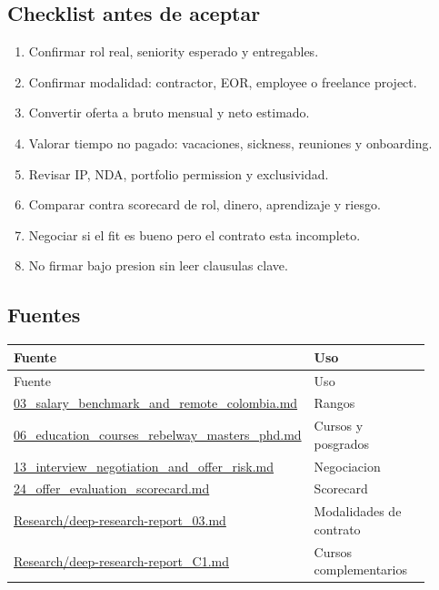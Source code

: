 \subsection{Checklist antes de aceptar}


\begin{enumerate}
\item Confirmar rol real, seniority esperado y entregables.
\item Confirmar modalidad: contractor, EOR, employee o freelance project.
\item Convertir oferta a bruto mensual y neto estimado.
\item Valorar tiempo no pagado: vacaciones, sickness, reuniones y onboarding.
\item Revisar IP, NDA, portfolio permission y exclusividad.
\item Comparar contra scorecard de rol, dinero, aprendizaje y riesgo.
\item Negociar si el fit es bueno pero el contrato esta incompleto.
\item No firmar bajo presion sin leer clausulas clave.
\end{enumerate}


\subsection{Fuentes}


\begin{center}
\scriptsize
\begin{longtable}{>{\raggedright\arraybackslash}p{0.455\linewidth} >{\raggedright\arraybackslash}p{0.455\linewidth}}
\toprule
Fuente & Uso \\
\midrule
\endfirsthead
\toprule
Fuente & Uso \\
\midrule
\endhead
\href{file:///E:/Laboral/03_salary_benchmark_and_remote_colombia.md}{03\_salary\_benchmark\_and\_remote\_colombia.md} & Rangos \\
\href{file:///E:/Laboral/06_education_courses_rebelway_masters_phd.md}{06\_education\_courses\_rebelway\_masters\_phd.md} & Cursos y posgrados \\
\href{file:///E:/Laboral/13_interview_negotiation_and_offer_risk.md}{13\_interview\_negotiation\_and\_offer\_risk.md} & Negociacion \\
\href{file:///E:/Laboral/24_offer_evaluation_scorecard.md}{24\_offer\_evaluation\_scorecard.md} & Scorecard \\
\href{file:///E:/Laboral/Research/deep-research-report_03.md}{Research/deep-research-report\_03.md} & Modalidades de contrato \\
\href{file:///E:/Laboral/Research/deep-research-report_C1.md}{Research/deep-research-report\_C1.md} & Cursos complementarios \\
\bottomrule
\end{longtable}
\end{center}
